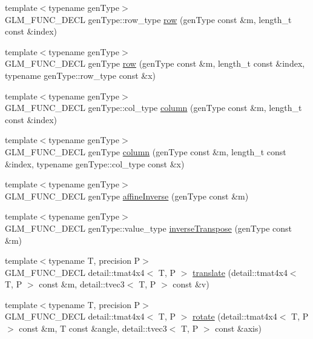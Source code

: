 \begin{CompactItemize}
\item 
{\footnotesize template$<$typename genType$>$ }\\GLM\_\-FUNC\_\-DECL genType::row\_\-type \hyperlink{group__gtc__matrix__access_g46e78366e4057c64e554cc442e407cca}{row} (genType const \&m, length\_\-t const \&index)
\item 
{\footnotesize template$<$typename genType$>$ }\\GLM\_\-FUNC\_\-DECL genType \hyperlink{group__gtc__matrix__access_g4409b9c0604f3ed3e6f116b6680eae44}{row} (genType const \&m, length\_\-t const \&index, typename genType::row\_\-type const \&x)
\item 
{\footnotesize template$<$typename genType$>$ }\\GLM\_\-FUNC\_\-DECL genType::col\_\-type \hyperlink{group__gtc__matrix__access_g8cd6c920268e4e2eb90ed2b30665d9e5}{column} (genType const \&m, length\_\-t const \&index)
\item 
{\footnotesize template$<$typename genType$>$ }\\GLM\_\-FUNC\_\-DECL genType \hyperlink{group__gtc__matrix__access_gea14296c0a9299135e7c7c03826c2604}{column} (genType const \&m, length\_\-t const \&index, typename genType::col\_\-type const \&x)
\item 
{\footnotesize template$<$typename genType$>$ }\\GLM\_\-FUNC\_\-DECL genType \hyperlink{group__gtc__matrix__inverse_g48364fa20265957b779a0708ae33f3dd}{affineInverse} (genType const \&m)
\item 
{\footnotesize template$<$typename genType$>$ }\\GLM\_\-FUNC\_\-DECL genType::value\_\-type \hyperlink{group__gtc__matrix__inverse_g63a905c74c61422e84008d466f1e3c49}{inverseTranspose} (genType const \&m)
\item 
{\footnotesize template$<$typename T, precision P$>$ }\\GLM\_\-FUNC\_\-DECL detail::tmat4x4$<$ T, P $>$ \hyperlink{group__gtc__matrix__transform_gb05e6ebabf535a3d8f9d9bfc3df45143}{translate} (detail::tmat4x4$<$ T, P $>$ const \&m, detail::tvec3$<$ T, P $>$ const \&v)
\item 
{\footnotesize template$<$typename T, precision P$>$ }\\GLM\_\-FUNC\_\-DECL detail::tmat4x4$<$ T, P $>$ \hyperlink{group__gtc__matrix__transform_g1a75da872120125437265872423e0b14}{rotate} (detail::tmat4x4$<$ T, P $>$ const \&m, T const \&angle, detail::tvec3$<$ T, P $>$ const \&axis)
\item 

\end{CompactItemize}
